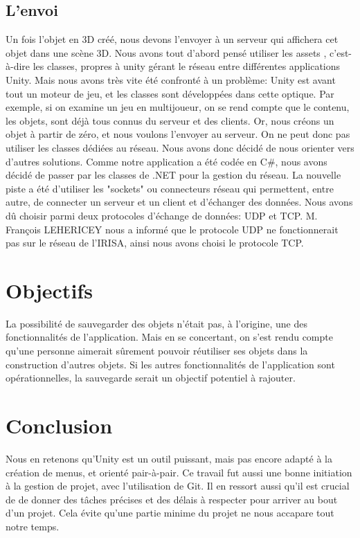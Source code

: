 \documentclass[a4paper,11pt]{article}
\begin{document}
		\subsection{L'envoi}
			Un fois l'objet en 3D créé, nous devons l'envoyer à un serveur qui affichera cet objet dans une scène 3D.
			Nous avons tout d'abord pensé utiliser les assets , c'est-à-dire les classes, propres à unity gérant le réseau entre différentes applications Unity. Mais nous avons très vite été confronté à un problème: Unity est avant tout un moteur de jeu, et les classes sont développées dans cette optique.
			Par exemple, si on examine un jeu en multijoueur, on se rend compte que le contenu, les objets, sont déjà tous connus du serveur et des clients. Or, nous créons un objet à partir de zéro, et nous voulons l'envoyer au serveur. On ne peut donc pas utiliser les classes dédiées au réseau. Nous avons donc décidé de nous orienter vers d'autres solutions.
			Comme notre application a été codée en C\#, nous avons décidé de passer par les classes de .NET pour la gestion du réseau.
			La nouvelle piste a été d'utiliser les "sockets" ou connecteurs réseau qui permettent, entre autre, de connecter un serveur et un client et d'échanger des données. Nous avons dû choisir parmi deux protocoles d'échange de données: UDP et TCP.
			M. François LEHERICEY nous a informé que le protocole UDP ne fonctionnerait pas sur le réseau de l'IRISA, ainsi nous avons choisi le protocole TCP.
	\section{Objectifs}
		La possibilité de sauvegarder des objets n'était pas, à l'origine, une des fonctionnalités de l'application. Mais en se concertant, on s'est rendu compte qu'une personne aimerait sûrement pouvoir réutiliser ses objets dans la construction d'autres objets. Si les autres fonctionnalités de l'application sont opérationnelles, la sauvegarde serait un objectif potentiel à rajouter.
	\section{Conclusion}
			Nous en retenons qu'Unity est un outil puissant, mais pas encore adapté à la création de menus, et orienté pair-à-pair. Ce travail fut aussi une bonne initiation à la gestion de projet, avec l'utilisation de Git. Il en ressort aussi qu'il est crucial de de donner des tâches précises et des délais à respecter pour arriver au bout d'un projet. Cela évite qu'une partie minime du projet ne nous accapare tout notre temps.
			
\end{document}

